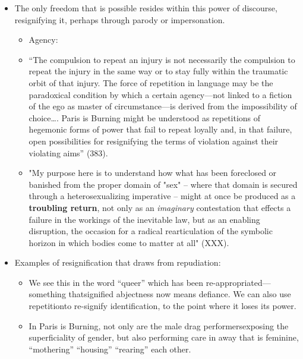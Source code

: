 \documentclass[11pt]{article}
\begin{document}
\begin{itemize}
\begin{enumerate}
\begin{itemize}
\begin{itemize}
fully control. The task will be to consider this threat and
disruption not as a permanent contestation of social norms
condemned to the pathos of perpetual failure, but rather as a
critical resource in the struggle to rearticulate the very
terms of symbolic legitimacy and intelligibility" (xiii).
\end{itemize}
\item The only freedom that is possible resides within this power of
discourse, resignifying it, perhaps through parody or
impersonation.
\begin{itemize}
\item Agency:
\item “The compulsion to repeat an injury is not necessarily the
compulsion to repeat the injury in the same way or to stay
fully within the traumatic orbit of that injury. The force of
repetition in language may be the paradoxical condition by
which a certain agency---not linked to a fiction of the ego
as master of circumstance---is derived from the impossibility
of choice…. Paris is Burning might be understood as
repetitions of hegemonic forms of power that fail to repeat
loyally and, in that failure, open possibilities for
resignifying the terms of violation against their violating
aims” (383).
\item "My purpose here is to understand how what has been
foreclosed or banished from the proper domain of "sex" --
where that domain is secured through a heterosexualizing
imperative -- might at once be produced as a \textbf{troubling
return}, not only as an \emph{imaginary} contestation that effects
a failure in the workings of the inevitable law, but as an
enabling disruption, the occasion for a radical
rearticulation of the symbolic horizon in which bodies come
to matter at all" (XXX).
\end{itemize}
\item Examples of resignification that draws from repudiation:
\begin{itemize}
\item We see this in the word “queer” which has been
re-appropriated---something thatsignified abjectness now
means defiance. We can also use repetitionto re-signify
identification, to the point where it loses its power.
\item In Paris is Burning, not only are the male drag
performersexposing the superficiality of gender, but also
performing care in away that is feminine, “mothering”
“housing” “rearing” each other.
\end{itemize}
\end{itemize}
\end{enumerate}
\end{itemize}
\end{document}
